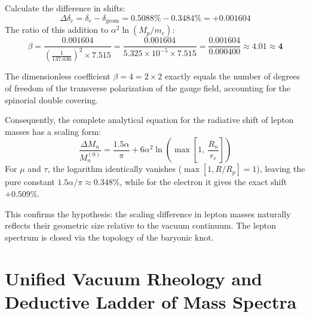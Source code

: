 \documentclass[12pt,a4paper]{article}
\begin{document}
	Calculate the difference in shifts:
	\begin{equation}
		\Delta \delta_e = \delta_e - \delta_{\text{geom}} = 0.5088\% - 0.3484\% = +0.001604
	\end{equation}
	The ratio of this addition to $\alpha^2 \ln(M_p/m_e)$:
	\begin{equation}
		\beta = \frac{0.001604}{\left(\frac{1}{137.036}\right)^2 \times 7.515} = \frac{0.001604}{5.325 \times 10^{-5} \times 7.515} = \frac{0.001604}{0.000400} \approx \mathbf{4.01} \approx \mathbf{4}
	\end{equation}
	
	The dimensionless coefficient $\beta = 4 = 2 \times 2$ exactly equals the number of degrees of freedom of the transverse polarization of the gauge field, accounting for the spinorial double covering. 
	
	Consequently, the complete analytical equation for the radiative shift of lepton masses has a scaling form:
	\begin{equation}
		\frac{\Delta M_n}{M_n^{(0)}} = \frac{1.5 \alpha}{\pi} + 6 \alpha^2 \ln\left( \max\left[ 1, \ \frac{R_n}{r_e} \right] \right)
	\end{equation}
	For $\mu$ and $\tau$, the logarithm identically vanishes ($\max[1, R/R_p] = 1$), leaving the pure constant $1.5\alpha/\pi \approx 0.348\%$, while for the electron it gives the exact shift $+0.509\%$.
	
	This confirms the hypothesis: the scaling difference in lepton masses naturally reflects their geometric size relative to the vacuum continuum.
	The lepton spectrum is closed via the topology of the baryonic knot.
	
	\section{Unified Vacuum Rheology and Deductive Ladder of Mass Spectra}
	
\end{document}
